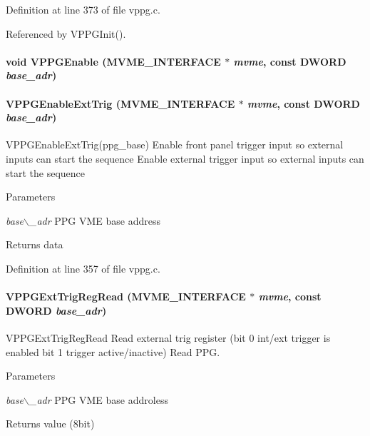 Definition at line 373 of file vppg.c.

Referenced by VPPGInit().
\paragraph[{VPPGEnable}]{\setlength{\rightskip}{0pt plus 5cm}void VPPGEnable ({\bf MVME\_\-INTERFACE} $\ast$ {\em mvme}, \/  const {\bf DWORD} {\em base\_\-adr})}\hfill\label{vppg_8h_ace405440a180389fc3b79f27dc41ab76}
\paragraph[{VPPGEnableExtTrig}]{ VPPGEnableExtTrig ({\bf MVME\_\-INTERFACE} $\ast$ {\em mvme}, \/  const {\bf DWORD} {\em base\_\-adr})}\hfill\label{vppg_8h_ad4f1d654e1523b2adb0a8007a4eedbef}
VPPGEnableExtTrig(ppg\_\-base) Enable front panel trigger input so external inputs can start the sequence  Enable external trigger input so external inputs can start the sequence 
\begin{DoxyParams}{Parameters}
\item[{\em base$\backslash$\_\-adr}]PPG VME base address \end{DoxyParams}
\begin{DoxyReturn}{Returns}
data 
\end{DoxyReturn}


Definition at line 357 of file vppg.c.
\paragraph[{VPPGExtTrigRegRead}]{ VPPGExtTrigRegRead ({\bf MVME\_\-INTERFACE} $\ast$ {\em mvme}, \/  const {\bf DWORD} {\em base\_\-adr})}\hfill\label{vppg_8h_a39c304959840cd2c1a0812a4c6ac0ee6}
VPPGExtTrigRegRead Read external trig register (bit 0 int/ext trigger is enabled bit 1 trigger active/inactive)  Read PPG. 
\begin{DoxyParams}{Parameters}
\item[{\em base$\backslash$\_\-adr}]PPG VME base addroless \end{DoxyParams}
\begin{DoxyReturn}{Returns}
value (8bit) 
\end{DoxyReturn}


